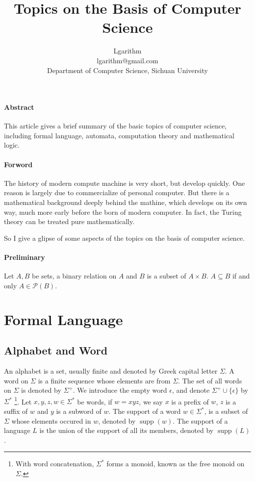 \documentclass{article}
\title{Topics on the Basis of Computer Science}
\author{Lgarithm\\ \mbox{lgarithm@gmail.com}\\ Department of Computer Science, Sichuan University}
\def\supp{\mathop{\mathrm{supp}}}
\begin{document}
\maketitle

\paragraph{Abstract}
This article gives a brief summary of the basic topics of computer science,
including formal language, automata, computation theory and mathematical logic.

\paragraph{Forword}
The history of modern compute machine is very short, but develop quickly.
One reason is largely due to commercialize of personal computer.
But there is a mathematical background deeply behind the mathine,
which develops on its own way, much more early before the born of modern computer.
In fact, the Turing theory can be treated pure mathematically.

So I give a glipse of some aspects of the topics on the basis of computer science.

\newpage
\tableofcontents
\newpage

\paragraph{Preliminary}
Let $A, B$ be sets, a binary relation on $A$ and $B$ is a subset of $A \times B$.
$A \subseteq B$ if and only $A \in \mathcal{P}(B)$.
\section{Formal Language}
\subsection{Alphabet and Word}
An alphabet is a set, usually finite and denoted by Greek capital letter $\Sigma$.
A word on $\Sigma$ is a finite sequence whose elements are from $\Sigma$.
The set of all words on $\Sigma$ is denoted by $\Sigma^+$.
We introduce the empty word $\epsilon$, and denote $\Sigma^+ \cup \{\epsilon\}$ by $\Sigma^\ast$
\footnote{With word concatenation, $\Sigma^\ast$ forms a monoid, known as the free monoid on
$\Sigma$.}.
Let $x, y, z, w \in \Sigma^\ast$ be words, if $w = xyz$, we say $x$ is a prefix of $w$,
$z$ is a suffix of $w$ and $y$ is a subword of $w$.
The support of a word $w \in \Sigma^\ast$, is a subset of $\Sigma$ whose elements occured in $w$,
denoted by $\supp(w)$.
The support of a language $L$ is the union of the support of all its members, denoted by $\supp(L)$.
\end{document}
